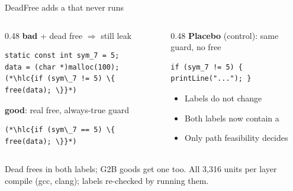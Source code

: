 \begin{frame}[fragile]{DeadFree adds a  that never runs}
  \begin{columns}[T]
    \begin{column}{0.48\textwidth}
      \textbf{bad} + dead free $\Rightarrow$ still \alert{leak}
\begin{lstlisting}[style=unit]
static const int sym_7 = 5;
data = (char *)malloc(100);
(*\hlc{if (sym\_7 != 5) \{ free(data); \}}*)
\end{lstlisting}
      \textbf{good}: real free, always-true guard
\begin{lstlisting}[style=unit]
(*\hlc{if (sym\_7 == 5) \{ free(data); \}}*)
\end{lstlisting}
    \end{column}
    \begin{column}{0.48\textwidth}
      \textbf{Placebo} (control): same guard, no free
\begin{lstlisting}[style=unit]
if (sym_7 != 5) { printLine("..."); }
\end{lstlisting}
      \vspace{4pt}
      \begin{itemize}
        \item Labels do not change
        \item Both labels now contain a 
        \item Only path feasibility decides
      \end{itemize}
    \end{column}
  \end{columns}
  \vfill
  {\scriptsize Dead frees in both labels; G2B goods get one too. All 3,316 units per layer compile (gcc, clang); labels re-checked by running them.\par}
\end{frame}

